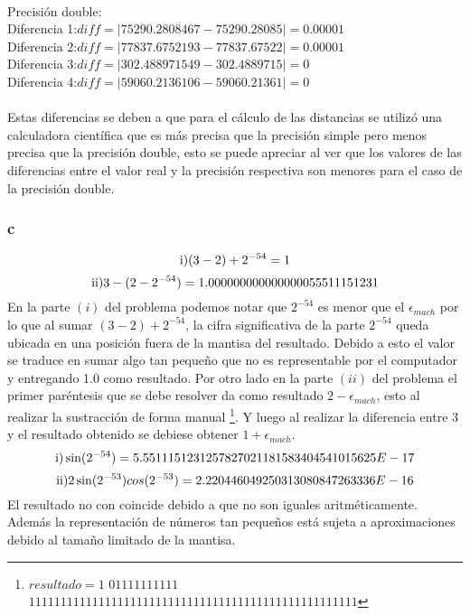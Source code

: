 \documentclass[a4paper,11pt]{article}
\begin{document}
\\
Precisión double:\\
Diferencia 1:$diff=|75290.2808467-75290.28085|=0.00001$\\
Diferencia 2:$diff=|77837.6752193-77837.67522|=0.00001$\\
Diferencia 3:$diff=|302.488971549-302.4889715|=0$\\
Diferencia 4:$diff=|59060.2136106-59060.21361|=0$\\
\\
Estas diferencias se deben a que para el cálculo de las distancias se utilizó una calculadora científica que es más precisa que la precisión simple pero menos precisa que la precisión double, esto se puede apreciar al ver que los valores de las diferencias entre el valor real y la precisión respectiva son menores para el caso de la precisión double. 

\subsubsection{c}

\begin{equation}
\textup{i)}\\(3-2)+2^{-54}=1
\end{equation}
\begin{equation}
\textup{ii)}\\3-(2-2^{-54})=1.000000000000000055511151231
\end{equation}
En la parte $(i)$ del problema podemos notar que $2^{-54}$ es menor que el $\epsilon_{mach}$  por lo que al sumar $(3-2) + 2^{-54}$, la cifra significativa de la parte $2^{-54}$ queda ubicada en una posición fuera de la mantisa del resultado. Debido a esto el valor se traduce en sumar algo tan pequeño que no es representable por el computador y entregando 1.0 como resultado.
Por otro lado en la parte $(ii)$ del problema el primer paréntesis que se debe resolver da como resultado $2-\epsilon_{mach}$, esto al realizar la sustracción de forma manual \footnote{$resultado=1$ $01111111111$ $1111111111111111111111111111111111111111111111111111$}. Y luego al realizar la diferencia entre 3 y el resultado obtenido se debiese obtener $1+\epsilon_{mach}$.
\\
\begin{equation}
\textup{i)}\\\sin(2^{-54}) = 5.5511151231257827021181583404541015625E-17
\end{equation}
\begin{equation}
\textup{ii)}\\2\sin(2^{-53})cos(2^{-53}) = 2.220446049250313080847263336E-16
\end{equation}
El resultado no con coincide debido a que no son iguales aritméticamente. Además la representación de números tan pequeños está sujeta a aproximaciones debido al tamaño limitado de la mantisa.
\end{document}
